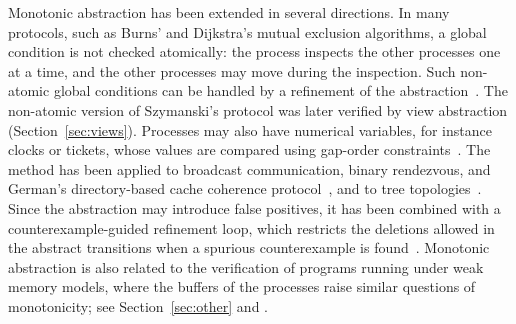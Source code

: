 Monotonic abstraction has been extended in several directions. In many
protocols, such as Burns' and Dijkstra's mutual exclusion algorithms, a global
condition is not checked atomically: the process inspects the other processes
one at a time, and the other processes may move during the inspection. Such
non-atomic global conditions can be handled by a refinement of the
abstraction~\cite{ABDR08}. The non-atomic version of Szymanski's protocol was
later verified by view abstraction (Section~\ref{sec:views}).
Processes may also have numerical variables, for instance clocks or tickets,
whose values are compared using gap-order constraints~\cite{ADR09}. The method
has been applied to broadcast communication, binary rendezvous, and German's
directory-based cache coherence protocol~\cite{ADHR07}, and to tree
topologies~\cite{ABDHR08}. Since the abstraction may introduce false positives, it
has been combined with a counterexample-guided refinement loop, which
restricts the deletions allowed in the abstract transitions when a spurious
counterexample is found~\cite{ACDHHR10}. Monotonic abstraction is also related
to the verification of programs running under weak memory models, where the
buffers of the processes raise similar questions of monotonicity; see
Section~\ref{sec:other} and .
